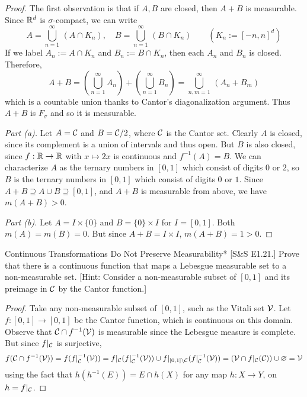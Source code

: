 \begin{proof}
    The first observation is that if \(A,B\) are closed, then \(A+B\) is measurable. Since \(\mathbb{R}^d\) is \(\sigma\)-compact, we can write 
    \[
    A = \bigcup_{n=1}^\infty \, (A \cap K_n), \quad B = \bigcup_{n=1}^\infty \, (B \cap K_n) \qquad (K_n := [-n, n]^d)
    \]
    If we label \(A_n := A \cap K_n\) and \(B_n := B \cap K_n\), then each \(A_n\) and \(B_n\) is closed. Therefore, 
    \[
    A + B
    = \left( \bigcup_{n=1}^\infty A_n \right) + \left( \bigcup_{n=1}^\infty B_n \right)
    = \bigcup_{n, m=1}^\infty \, (A_n + B_m)
    \]
    which is a countable union thanks to Cantor's diagonalization argument. Thus \(A+B\) is \(F_\sigma\) and so it is measurable. 

    \textit{Part (a).} Let \(A = \mathcal{C}\) and \(B = \mathcal{C} / 2\), where \(\mathcal{C}\) is the Cantor set. Clearly \(A\) is closed, since its complement is a union of intervals and thus open. But \(B\) is also closed, since \(f : \mathbb{R} \to \mathbb{R}\) with \(x \mapsto 2x\) is continuous and \(f^{-1}(A) = B\). We can characterize \(A\) as the ternary numbers in \([0,1]\) which consist of digits \(0\) or \(2\), so \(B\) is the ternary numbers in \([0,1]\) which consist of digits \(0\) or \(1\). Since \(A+B \supseteq A \cup B \supseteq [0,1]\), and \(A+B\) is measurable from above, we have \(m(A+B) > 0\). 

    \textit{Part (b).} Let \(A = I \times \{0\}\) and \(B = \{0\} \times I\) for \(I = [0,1]\). Both \(m(A) = m(B) = 0\). But since \(A+B = I \times I\), \(m(A+B) = 1 > 0\). 
\end{proof}

\begin{problem}{Continuous Transformations Do Not Preserve Measurability}*
    [S\&S E1.21.] Prove that there is a continuous function that maps a Lebesgue measurable set to a non-measurable set. [Hint: Consider a non-measurable subset of \([0,1]\) and its preimage in \(\mathcal{C}\) by the Cantor function.]
\end{problem}

\begin{proof}
    Take any non-measurable subset of \([0,1]\), such as the Vitali set \(\mathcal{V}\). Let \(f : [0,1] \to [0,1]\) be the Cantor function, which is continuous on this domain. Observe that \(\mathcal{C} \cap f^{-1}(\mathcal{V})\) is measurable since the Lebesgue measure is complete. But since \(f \vert_{\mathcal{C}}\) is surjective, 
    \[
    f(\mathcal{C} \cap f^{-1}(\mathcal{V}))
    = f(f\vert_{\mathcal{C}}^{-1}(\mathcal{V}))
    = f\vert_{\mathcal{C}}(f\vert_{\mathcal{C}}^{-1}(\mathcal{V})) \cup f\vert_{[0,1] \setminus \mathcal{C}} (f\vert_{\mathcal{C}}^{-1}(\mathcal{V}))
    = (\mathcal{V} \cap f\vert_{\mathcal{C}}(\mathcal{C})) \cup \varnothing
     = \mathcal{V}
    \]
    using the fact that \(h(h^{-1}(E)) = E \cap h(X)\) for any map \(h : X \to Y\), on \(h = f\vert_{\mathcal{C}}\). 
\end{proof}


